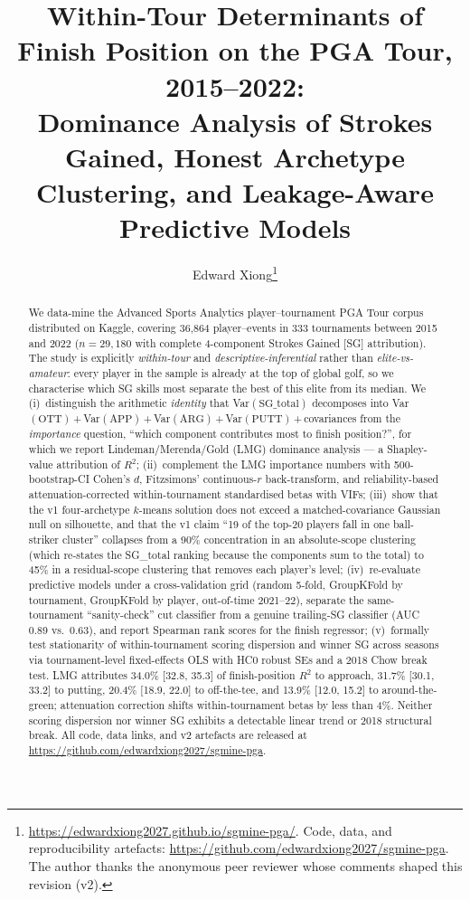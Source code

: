 \documentclass[11pt]{article}
\title{\textbf{Within-Tour Determinants of Finish Position on the PGA Tour, 2015--2022:\\
\large Dominance Analysis of Strokes Gained, Honest Archetype Clustering, and Leakage-Aware Predictive Models}}
\author{Edward Xiong\thanks{\url{https://edwardxiong2027.github.io/sgmine-pga/}. Code, data, and reproducibility artefacts: \url{https://github.com/edwardxiong2027/sgmine-pga}. The author thanks the anonymous peer reviewer whose comments shaped this revision (v2).}}
\date{}
\begin{document}
\maketitle

\begin{abstract}
We data-mine the Advanced Sports Analytics player--tournament PGA Tour corpus distributed on Kaggle, covering 36{,}864 player--events in 333 tournaments between 2015 and 2022 ($n = 29{,}180$ with complete 4-component Strokes Gained [SG] attribution).  The study is explicitly \emph{within-tour} and \emph{descriptive-inferential} rather than \emph{elite-vs-amateur}: every player in the sample is already at the top of global golf, so we characterise which SG skills most separate the best of this elite from its median.  We (i)~distinguish the arithmetic \emph{identity} that Var$(\text{SG\_total})$ decomposes into Var$(\text{OTT})$\,+\,Var$(\text{APP})$\,+\,Var$(\text{ARG})$\,+\,Var$(\text{PUTT})$\,+\,covariances from the \emph{importance} question, ``which component contributes most to finish position?'', for which we report Lindeman/Merenda/Gold (LMG) dominance analysis --- a Shapley-value attribution of $R^2$; (ii)~complement the LMG importance numbers with 500-bootstrap-CI Cohen's $d$, Fitzsimons' continuous-$r$ back-transform, and reliability-based attenuation-corrected within-tournament standardised betas with VIFs; (iii)~show that the v1 four-archetype $k$-means solution does not exceed a matched-covariance Gaussian null on silhouette, and that the v1 claim ``19 of the top-20 players fall in one ball-striker cluster'' collapses from a 90\% concentration in an absolute-scope clustering (which re-states the SG\_total ranking because the components sum to the total) to 45\% in a residual-scope clustering that removes each player's level; (iv)~re-evaluate predictive models under a cross-validation grid (random 5-fold, GroupKFold by tournament, GroupKFold by player, out-of-time 2021--22), separate the same-tournament ``sanity-check'' cut classifier from a genuine trailing-SG classifier (AUC 0.89 vs.\ 0.63), and report Spearman rank scores for the finish regressor; (v)~formally test stationarity of within-tournament scoring dispersion and winner SG across seasons via tournament-level fixed-effects OLS with HC0 robust SEs and a 2018 Chow break test.  LMG attributes 34.0\% [32.8, 35.3] of finish-position $R^2$ to approach, 31.7\% [30.1, 33.2] to putting, 20.4\% [18.9, 22.0] to off-the-tee, and 13.9\% [12.0, 15.2] to around-the-green; attenuation correction shifts within-tournament betas by less than 4\%.  Neither scoring dispersion nor winner SG exhibits a detectable linear trend or 2018 structural break.  All code, data links, and v2 artefacts are released at \url{https://github.com/edwardxiong2027/sgmine-pga}.
\end{abstract}
\end{document}
